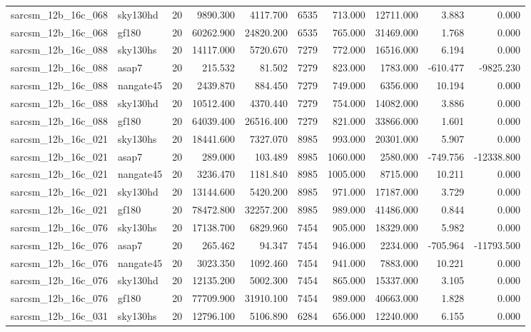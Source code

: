 \documentclass{article}
\begin{document}
\begin{longtable}{llrrrrrrrr}
sarcsm\_12b\_16c\_068 & sky130hd & 20 & 9890.300 & 4117.700 & 6535 & 713.000 & 12711.000 & 3.883 & 0.000 \\
sarcsm\_12b\_16c\_068 & gf180 & 20 & 60262.900 & 24820.200 & 6535 & 765.000 & 31469.000 & 1.768 & 0.000 \\
sarcsm\_12b\_16c\_088 & sky130hs & 20 & 14117.000 & 5720.670 & 7279 & 772.000 & 16516.000 & 6.194 & 0.000 \\
sarcsm\_12b\_16c\_088 & asap7 & 20 & 215.532 & 81.502 & 7279 & 823.000 & 1783.000 & -610.477 & -9825.230 \\
sarcsm\_12b\_16c\_088 & nangate45 & 20 & 2439.870 & 884.450 & 7279 & 749.000 & 6356.000 & 10.194 & 0.000 \\
sarcsm\_12b\_16c\_088 & sky130hd & 20 & 10512.400 & 4370.440 & 7279 & 754.000 & 14082.000 & 3.886 & 0.000 \\
sarcsm\_12b\_16c\_088 & gf180 & 20 & 64039.400 & 26516.400 & 7279 & 821.000 & 33866.000 & 1.601 & 0.000 \\
sarcsm\_12b\_16c\_021 & sky130hs & 20 & 18441.600 & 7327.070 & 8985 & 993.000 & 20301.000 & 5.907 & 0.000 \\
sarcsm\_12b\_16c\_021 & asap7 & 20 & 289.000 & 103.489 & 8985 & 1060.000 & 2580.000 & -749.756 & -12338.800 \\
sarcsm\_12b\_16c\_021 & nangate45 & 20 & 3236.470 & 1181.840 & 8985 & 1005.000 & 8715.000 & 10.211 & 0.000 \\
sarcsm\_12b\_16c\_021 & sky130hd & 20 & 13144.600 & 5420.200 & 8985 & 971.000 & 17187.000 & 3.729 & 0.000 \\
sarcsm\_12b\_16c\_021 & gf180 & 20 & 78472.800 & 32257.200 & 8985 & 989.000 & 41486.000 & 0.844 & 0.000 \\
sarcsm\_12b\_16c\_076 & sky130hs & 20 & 17138.700 & 6829.960 & 7454 & 905.000 & 18329.000 & 5.982 & 0.000 \\
sarcsm\_12b\_16c\_076 & asap7 & 20 & 265.462 & 94.347 & 7454 & 946.000 & 2234.000 & -705.964 & -11793.500 \\
sarcsm\_12b\_16c\_076 & nangate45 & 20 & 3023.350 & 1092.460 & 7454 & 941.000 & 7883.000 & 10.221 & 0.000 \\
sarcsm\_12b\_16c\_076 & sky130hd & 20 & 12135.200 & 5002.300 & 7454 & 865.000 & 15337.000 & 3.105 & 0.000 \\
sarcsm\_12b\_16c\_076 & gf180 & 20 & 77709.900 & 31910.100 & 7454 & 989.000 & 40663.000 & 1.828 & 0.000 \\
sarcsm\_12b\_16c\_031 & sky130hs & 20 & 12796.100 & 5106.890 & 6284 & 656.000 & 12240.000 & 6.155 & 0.000 \\

\end{longtable}
\end{document}
